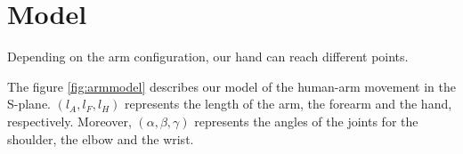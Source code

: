 

%
%




\section{Model}

Depending on the arm configuration, our hand can reach different points. 

The figure \ref{fig:armmodel} describes our model of the human-arm movement in the S-plane. $(l_A,l_F,l_H)$ represents the length of the arm, the forearm and the
hand, respectively. Moreover, $(\alpha,\beta,\gamma)$ represents the angles of the joints for the shoulder, the elbow and the wrist.

